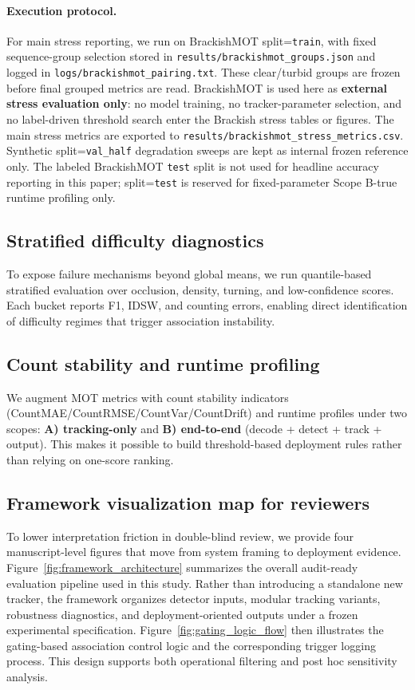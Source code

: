 \documentclass[5p,twocolumn,a4paper]{elsarticle}
\begin{document}
\paragraph{Execution protocol.}
For main stress reporting, we run on BrackishMOT split=\texttt{train}, with fixed sequence-group selection stored in \texttt{results/brackishmot\_groups.json} and logged in \texttt{logs/brackishmot\_pairing.txt}. These clear/turbid groups are frozen before final grouped metrics are read. BrackishMOT is used here as \textbf{external stress evaluation only}: no model training, no tracker-parameter selection, and no label-driven threshold search enter the Brackish stress tables or figures. The main stress metrics are exported to \texttt{results/brackishmot\_stress\_metrics.csv}. Synthetic split=\texttt{val\_half} degradation sweeps are kept as internal frozen reference only.
The labeled BrackishMOT \texttt{test} split is not used for headline accuracy reporting in this paper; split=\texttt{test} is reserved for fixed-parameter Scope B-true runtime profiling only.

\subsection{Stratified difficulty diagnostics}
To expose failure mechanisms beyond global means, we run quantile-based stratified evaluation over occlusion, density, turning, and low-confidence scores. Each bucket reports F1, IDSW, and counting errors, enabling direct identification of difficulty regimes that trigger association instability.

\subsection{Count stability and runtime profiling}
We augment MOT metrics with count stability indicators (CountMAE/CountRMSE/CountVar/CountDrift) and runtime profiles under two scopes: \textbf{A) tracking-only} and \textbf{B) end-to-end} (decode + detect + track + output). This makes it possible to build threshold-based deployment rules rather than relying on one-score ranking.

\subsection{Framework visualization map for reviewers}
To lower interpretation friction in double-blind review, we provide four manuscript-level figures that move from system framing to deployment evidence. Figure~\ref{fig:framework_architecture} summarizes the overall audit-ready evaluation pipeline used in this study. Rather than introducing a standalone new tracker, the framework organizes detector inputs, modular tracking variants, robustness diagnostics, and deployment-oriented outputs under a frozen experimental specification. Figure~\ref{fig:gating_logic_flow} then illustrates the gating-based association control logic and the corresponding trigger logging process. This design supports both operational filtering and post hoc sensitivity analysis.
\end{document}
